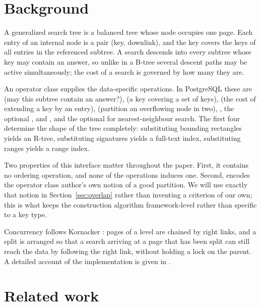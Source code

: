 \section{Background}
\label{sec:background}

A generalized search tree is a balanced tree whose node occupies one page. Each
entry of an internal node is a pair (key, downlink), and the key covers the keys
of all entries in the referenced subtree. A search descends into every subtree
whose key may contain an answer, so unlike in a B-tree several descent paths may
be active simultaneously; the cost of a search is governed by how many they are.

An operator class supplies the data-specific operations. In PostgreSQL these are
 (may this subtree contain an answer?),  (a key
covering a set of keys),  (the cost of extending a key by an
entry),  (partition an overflowing node in two), ,
the optional ,  and , and the
optional  for nearest-neighbour search. The first four determine
the shape of the tree completely: substituting bounding rectangles yields an
R-tree, substituting signatures yields a full-text index, substituting ranges
yields a range index.

Two properties of this interface matter throughout the paper. First, it contains
no ordering operation, and none of the operations induces one. Second,
 encodes the operator class author's own notion of a good
partition. We will use exactly that notion in Section~\ref{sec:overlap} rather
than inventing a criterion of our own; this is what keeps the construction
algorithm framework-level rather than specific to a key type.

Concurrency follows Kornacker \cite{kornacker1997concurrency}: pages of a level
are chained by right links, and a split is arranged so that a search arriving at
a page that has been split can still reach the data by following the right link,
without holding a lock on the parent. A detailed account of the implementation
is given in \cite{rogov2026}.

\section{Related work}
\label{sec:related}

